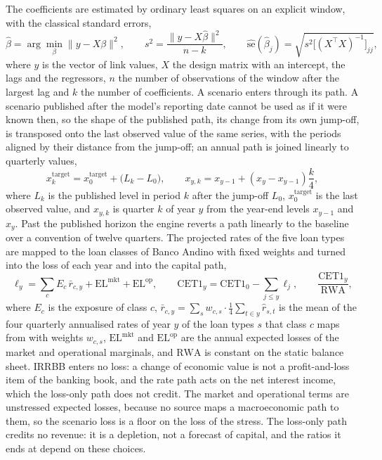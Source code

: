 The coefficients are estimated by ordinary least squares on an explicit window, with the classical standard errors,
\begin{equation}
\hat\beta=\arg\min_{\beta}\lVert y-X\beta\rVert^{2},\qquad
s^{2}=\frac{\lVert y-X\hat\beta\rVert^{2}}{n-k},\qquad
\widehat{\mathrm{se}}(\hat\beta_j)=\sqrt{s^{2}\bigl[(X^{\top}X)^{-1}\bigr]_{jj}},
\label{eq:st-ols}
\end{equation}
where $y$ is the vector of link values, $X$ the design matrix with an intercept, the lags and the regressors, $n$ the number of
observations of the window after the largest lag and $k$ the number of coefficients. A scenario enters through its path.
A scenario published after the model's reporting date cannot be used as if it were known then, so the shape of the published
path, its change from its own jump-off, is transposed onto the last observed value of the same series, with the periods aligned
by their distance from the jump-off; an annual path is joined linearly to quarterly values,
\begin{equation}
x^{\mathrm{target}}_{k}=x^{\mathrm{target}}_{0}+\bigl(L_{k}-L_{0}\bigr),\qquad
x_{y,k}=x_{y-1}+(x_{y}-x_{y-1})\frac{k}{4},
\label{eq:st-transpose}
\end{equation}
where $L_k$ is the published level in period $k$ after the jump-off $L_0$, $x^{\mathrm{target}}_{0}$ is the last observed value,
and $x_{y,k}$ is quarter $k$ of year $y$ from the year-end levels $x_{y-1}$ and $x_y$. Past the published horizon the engine
reverts a path linearly to the baseline over a convention of twelve quarters. The projected rates of the five loan types are
mapped to the loan classes of Banco Andino with fixed weights and turned into the loss of each year and into the capital path,
\begin{equation}
\ell_y=\sum_{c}E_c\,\bar r_{c,y}+\mathrm{EL}^{\mathrm{mkt}}+\mathrm{EL}^{\mathrm{op}},\qquad
\mathrm{CET1}_y=\mathrm{CET1}_0-\sum_{j\le y}\ell_j,\qquad
\frac{\mathrm{CET1}_y}{\mathrm{RWA}},
\label{eq:st-capital}
\end{equation}
where $E_c$ is the exposure of class $c$, $\bar r_{c,y}=\sum_{s}w_{c,s}\cdot\tfrac14\sum_{t\in y}\hat r_{s,t}$ is the mean of the
four quarterly annualised rates of year $y$ of the loan types $s$ that class $c$ maps from with weights $w_{c,s}$, $\mathrm{EL}^{\mathrm{mkt}}$
and $\mathrm{EL}^{\mathrm{op}}$ are the annual expected losses of the market and operational marginals, and $\mathrm{RWA}$ is constant on the static balance
sheet. IRRBB enters no loss: a change of economic value is not a profit-and-loss item of the banking book, and the rate path acts
on the net interest income, which the loss-only path does not credit. The market and operational terms are unstressed expected
losses, because no source maps a macroeconomic path to them, so the scenario loss is a floor on the loss of the stress. The
loss-only path credits no revenue: it is a depletion, not a forecast of capital, and the ratios it ends at depend on these
choices.

